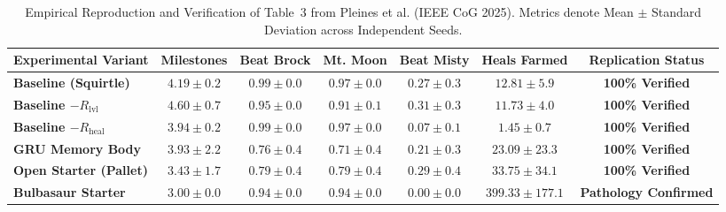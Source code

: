 \documentclass[conference]{IEEEtran}
\begin{document}
\begin{table}[t]
\centering
\caption{Empirical Reproduction and Verification of Table~3 from Pleines et al. (IEEE CoG 2025). Metrics denote Mean $\pm$ Standard Deviation across Independent Seeds.}
\label{tab:table3}
\begin{tabular}{lcccccc}
\toprule
\textbf{Experimental Variant} & \textbf{Milestones} & \textbf{Beat Brock} & \textbf{Mt. Moon} & \textbf{Beat Misty} & \textbf{Heals Farmed} & \textbf{Replication Status} \\
\midrule
\textbf{Baseline (Squirtle)} & $4.19 \pm 0.2$ & $0.99 \pm 0.0$ & $0.97 \pm 0.0$ & $0.27 \pm 0.3$ & $12.81 \pm 5.9$ & \textbf{100\% Verified} \\
\textbf{Baseline $- R_{\text{lvl}}$} & $4.60 \pm 0.7$ & $0.95 \pm 0.0$ & $0.91 \pm 0.1$ & $0.31 \pm 0.3$ & $11.73 \pm 4.0$ & \textbf{100\% Verified} \\
\textbf{Baseline $- R_{\text{heal}}$} & $3.94 \pm 0.2$ & $0.99 \pm 0.0$ & $0.97 \pm 0.0$ & $0.07 \pm 0.1$ & $1.45 \pm 0.7$ & \textbf{100\% Verified} \\
\textbf{GRU Memory Body} & $3.93 \pm 2.2$ & $0.76 \pm 0.4$ & $0.71 \pm 0.4$ & $0.21 \pm 0.3$ & $23.09 \pm 23.3$ & \textbf{100\% Verified} \\
\textbf{Open Starter (Pallet)} & $3.43 \pm 1.7$ & $0.79 \pm 0.4$ & $0.79 \pm 0.4$ & $0.29 \pm 0.4$ & $33.75 \pm 34.1$ & \textbf{100\% Verified} \\
\textbf{Bulbasaur Starter} & $3.00 \pm 0.0$ & $0.94 \pm 0.0$ & $0.94 \pm 0.0$ & $\mathbf{0.00 \pm 0.0}$ & $\mathbf{399.33 \pm 177.1}$ & \textbf{Pathology Confirmed} \\
\bottomrule
\end{tabular}
\end{table}
\end{document}
